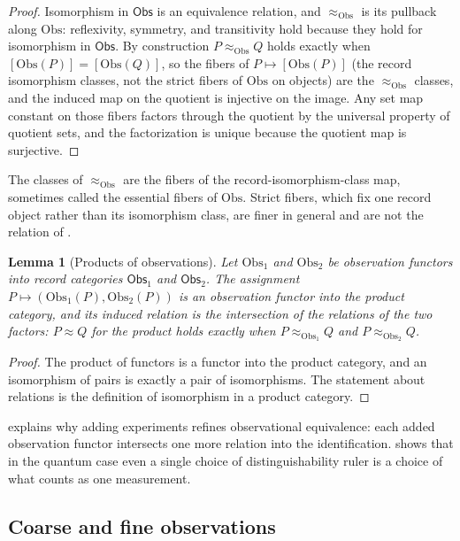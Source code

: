\documentclass[11pt,letterpaper]{article}
\newtheorem{lemma}[theorem]{Lemma}
\theoremstyle{definition}
\theoremstyle{remark}
\begin{document}
\begin{proof}
Isomorphism in $\mathsf{Obs}$ is an equivalence relation, and $\approx_{\mathrm{Obs}}$ is its pullback along $\mathrm{Obs}$: reflexivity, symmetry, and transitivity hold because they hold for isomorphism in $\mathsf{Obs}$. By construction $P \approx_{\mathrm{Obs}} Q$ holds exactly when $[\mathrm{Obs}(P)] = [\mathrm{Obs}(Q)]$, so the fibers of $P \mapsto [\mathrm{Obs}(P)]$ (the record isomorphism classes, not the strict fibers of $\mathrm{Obs}$ on objects) are the $\approx_{\mathrm{Obs}}$ classes, and the induced map on the quotient is injective on the image. Any set map constant on those fibers factors through the quotient by the universal property of quotient sets, and the factorization is unique because the quotient map is surjective.
\end{proof}

The classes of $\approx_{\mathrm{Obs}}$ are the fibers of the record-isomorphism-class map, sometimes called the essential fibers of $\mathrm{Obs}$. Strict fibers, which fix one record object rather than its isomorphism class, are finer in general and are not the relation of .

\begin{lemma}[Products of observations]
\label{lem:products}
Let $\mathrm{Obs}_1$ and $\mathrm{Obs}_2$ be observation functors into record categories $\mathsf{Obs}_1$ and $\mathsf{Obs}_2$. The assignment $P \mapsto (\mathrm{Obs}_1(P), \mathrm{Obs}_2(P))$ is an observation functor into the product category, and its induced relation is the intersection of the relations of the two factors: $P \approx Q$ for the product holds exactly when $P \approx_{\mathrm{Obs}_1} Q$ and $P \approx_{\mathrm{Obs}_2} Q$.
\end{lemma}

\begin{proof}
The product of functors is a functor into the product category, and an isomorphism of pairs is exactly a pair of isomorphisms. The statement about relations is the definition of isomorphism in a product category.
\end{proof}

 explains why adding experiments refines observational equivalence: each added observation functor intersects one more relation into the identification.  shows that in the quantum case even a single choice of distinguishability ruler is a choice of what counts as one measurement.

\subsection{Coarse and fine observations}
\label{sec:coarse}
\end{document}
